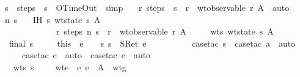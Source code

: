\begin{isabellebody}
\ \ \isamarkupfalse \ s\ \isamarkupfalse \ {\isachardoublequoteopen}steps\ {}\ s\ {\isacharequal}\ OTimeOut{\isachardoublequoteclose}\ \isamarkupfalse \ simp\isanewline
\ \ \isamarkupfalse \ {\isachardoublequoteopen}{\isasymexists}r{\isachardot}\ steps\ {}\ s\ {\isacharequal}\ r\ {\isasymand}\ wt{\isacharunderscore}observable\ r\ A{\isachardoublequoteclose}\ \isamarkupfalse \ auto\isanewline
{}\isamarkupfalse \isanewline
\ \ \isamarkupfalse \ n\ s\isanewline
\ \ \isamarkupfalse \ IH{\isacharcolon}\ {\isachardoublequoteopen}{\isasymAnd}s{\isachardot}\ wt{\isacharunderscore}state\ s\ A\ {\isasymLongrightarrow}\isanewline
\ \ \ \ \ \ \ \ \ \ \ \ \ \ \ {\isacharparenleft}{\isasymexists}r{\isachardot}\ steps\ n\ s\ {\isacharequal}\ r\ {\isasymand}\ wt{\isacharunderscore}observable\ r\ A{\isacharparenright}{\isachardoublequoteclose}\isanewline
\ \ \ \ \ wts{\isacharcolon}\ {\isachardoublequoteopen}wt{\isacharunderscore}state\ s\ A{\isachardoublequoteclose}\isanewline
\ \ \isacommand{{\isacharbraceleft}}\isamarkupfalse \ \isamarkupfalse \ {\isachardoublequoteopen}final\ s{\isachardoublequoteclose}\isanewline
\ \ \ \ \isamarkupfalse \ this\ \isamarkupfalse \ e\ {\isasymrho}\ {\isasymmu}\ \ s{\isacharcolon}\ {\isachardoublequoteopen}s\ {\isacharequal}\ {\isacharparenleft}SRet\ e{\isacharcomma}\ {\isasymrho}{\isacharcomma}\ {\isacharbrackleft}{\isacharbrackright}{\isacharcomma}\ {\isasymmu}{\isacharcomma}{\isacharbrackleft}{\isacharbrackright}{\isacharparenright}{\isachardoublequoteclose}\isanewline
\ \ \ \ \ \ \isamarkupfalse \ {\isacharparenleft}case{\isacharunderscore}tac\ s{\isacharparenright}\ \isamarkupfalse \ {\isacharparenleft}case{\isacharunderscore}tac\ a{\isacharparenright}\ \isamarkupfalse \ auto\isanewline
\ \ \ \ \ \ \isamarkupfalse \ {\isacharparenleft}case{\isacharunderscore}tac\ c{\isacharparenright}\ \isamarkupfalse \ auto\ \isamarkupfalse \ {\isacharparenleft}case{\isacharunderscore}tac\ e{\isacharparenright}\ \isamarkupfalse \ auto\ \isamarkupfalse \isanewline
\ \ \ \ \isamarkupfalse \ wts\ s\ \isamarkupfalse \ {\isasymGamma}\ {\isasymSigma}\ \ wte{\isacharcolon}\ {\isachardoublequoteopen}{\isasymGamma}\ {\isasymturnstile}\isactrlisub e\ e\ {\isacharcolon}\ A{\isachardoublequoteclose}\ \ wtg{\isacharcolon}\ {\isachardoublequoteopen}{\isasymGamma}{\isacharsemicolon}{\isasymSigma}\ {\isasymturnstile}\ {\isasymrho}{\isachardoublequoteclose}\ \isanewline

\end{isabellebody}
